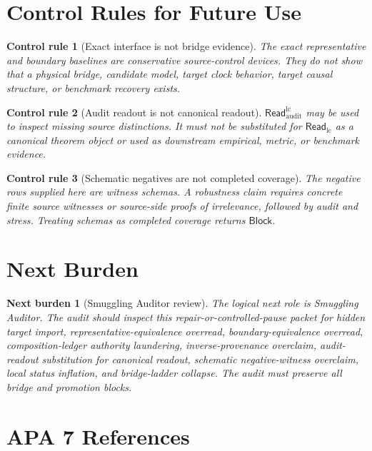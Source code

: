 \documentclass[11pt]{article}
\newcommand{\ReadLC}{\mathsf{Read}_{\mathrm{lc}}}
\newcommand{\ReadAudit}{\mathsf{Read}_{\mathrm{audit}}^{\mathrm{lc}}}
\newcommand{\Block}{\mathsf{Block}}
\newtheorem{controlrule}{Control rule}
\newtheorem{nextburden}{Next burden}
\begin{document}
\section{Control Rules for Future Use}

\begin{controlrule}[Exact interface is not bridge evidence]
The exact representative and boundary baselines are conservative
source-control devices. They do not show that a physical bridge,
candidate model, target clock behavior, target causal structure, or
benchmark recovery exists.
\end{controlrule}

\begin{controlrule}[Audit readout is not canonical readout]
\(\ReadAudit\) may be used to inspect missing source distinctions. It
must not be substituted for \(\ReadLC\) as a canonical theorem object
or used as downstream empirical, metric, or benchmark evidence.
\end{controlrule}

\begin{controlrule}[Schematic negatives are not completed coverage]
The negative rows supplied here are witness schemas. A robustness claim
requires concrete finite source witnesses or source-side proofs of
irrelevance, followed by audit and stress. Treating schemas as
completed coverage returns \(\Block\).
\end{controlrule}

\section{Next Burden}

\begin{nextburden}[Smuggling Auditor review]
The logical next role is Smuggling Auditor. The audit should inspect
this repair-or-controlled-pause packet for hidden target import,
representative-equivalence overread, boundary-equivalence overread,
composition-ledger authority laundering, inverse-provenance overclaim,
audit-readout substitution for canonical readout, schematic
negative-witness overclaim, local status inflation, and bridge-ladder
collapse. The audit must preserve all bridge and promotion blocks.
\end{nextburden}

\section*{APA 7 References}
\end{document}
